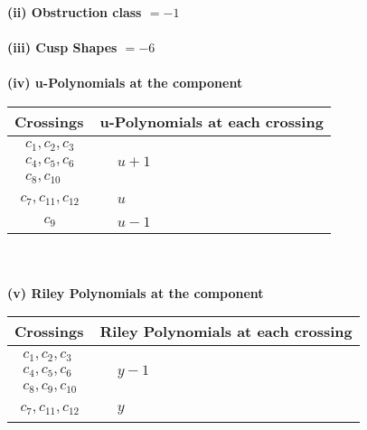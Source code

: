 \documentclass[1p]{elsarticle_modified}
\theoremstyle{definition}
\begin{document}
\flushleft \textbf{(ii) Obstruction class $= -1$}\\~\\
\flushleft \textbf{(iii) Cusp Shapes $= -6$}\\~\\
\newpage\renewcommand{\arraystretch}{1}
\flushleft \textbf{(iv) u-Polynomials at the component}\newline \\
\begin{tabular}{m{50pt}|m{274pt}}
Crossings & \hspace{64pt}u-Polynomials at each crossing \\
\hline $$\begin{aligned}c_{1},c_{2},c_{3}\\c_{4},c_{5},c_{6}\\c_{8},c_{10}\end{aligned}$$&$\begin{aligned}
&u+1
\end{aligned}$\\
\hline $$\begin{aligned}c_{7},c_{11},c_{12}\end{aligned}$$&$\begin{aligned}
&u
\end{aligned}$\\
\hline $$\begin{aligned}c_{9}\end{aligned}$$&$\begin{aligned}
&u-1
\end{aligned}$\\
\hline
\end{tabular}\\~\\
\newpage\renewcommand{\arraystretch}{1}
\flushleft \textbf{(v) Riley Polynomials at the component}\newline \\
\begin{tabular}{m{50pt}|m{274pt}}
Crossings & \hspace{64pt}Riley Polynomials at each crossing \\
\hline $$\begin{aligned}c_{1},c_{2},c_{3}\\c_{4},c_{5},c_{6}\\c_{8},c_{9},c_{10}\end{aligned}$$&$\begin{aligned}
&y-1
\end{aligned}$\\
\hline $$\begin{aligned}c_{7},c_{11},c_{12}\end{aligned}$$&$\begin{aligned}
&y
\end{aligned}$\\
\hline
\end{tabular}\\~\\
\end{document}
